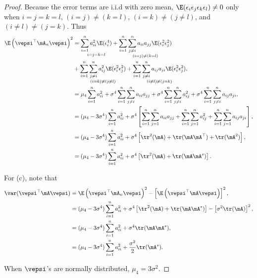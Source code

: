 \documentclass[english,12pt]{book}\usepackage[]{graphicx}\usepackage[]{xcolor}
\begin{document}
\begin{proof}
Because the error terms are i.i.d with zero mean, $\E(\epsilon_{i}\epsilon_j\epsilon_k\epsilon_l) \neq 0$ only when $i = j = k = l$, $(i = j)\neq(k = l)$, $(i = k)\neq (j\neq l)$, and $(i\neq l)\neq (j =k)$. Thus
\begin{equation*}
\begin{aligned}
\E\left(\vepsi^\top\mA_n\vepsi\right)^2 & = \underset{i = j = k = l}{\sum_{i = 1}^n a_{ii}^2\E(\epsilon_i^4)} + \underset{(i = j)\neq(k = l)}{\sum_{i = 1}^n\sum_{j\neq i}^na_{ii}a_{jj}\E(\epsilon_i^2\epsilon_j^2)} \\
& + \underset{(i = k)\neq (j\neq l)}{\sum_{i = 1}^n\sum_{j\neq i}^n a_{ij}^2\E(\epsilon_i^2\epsilon_j^2)} + \underset{(i\neq l)\neq (j =k)}{\sum_{i = 1}^n\sum_{j \neq i}^na_{ij}a_{ji}\E(\epsilon_i^2\epsilon_j^2)},\\
& = \mu_4\sum_{i = 1}^na_{ii}^2 + \sigma^4\sum_{i = 1}^n\sum_{j\neq i}^na_{ii}a_{jj} + \sigma^4\sum_{i = 1}^n\sum_{j\neq i}^n a_{ij}^2 + \sigma^4\sum_{i = 1}^n\sum_{j \neq i}^na_{ij}a_{ji}, \\
& = (\mu_4 - 3\sigma^4)\sum_{i=1}^na_{ii}^2 + \sigma^4\left[\sum_{i = 1}^n\sum_{j = 1}^n a_{ii}a_{jj} + \sum_{i = 1}^n\sum_{j=1}^na^2_{ij} + \sum_{i = 1}^n\sum_{j = 1}^na_{ij}a_{ji}\right], \\
& = (\mu_4 - 3\sigma^4)\sum_{i=1}^na_{ii}^2 + \sigma^4\left[\tr^2(\mA) + \tr(\mA\mA^\top) + \tr(\mA^2)\right], \\
& = (\mu_4 - 3\sigma^4)\sum_{i=1}^na_{ii}^2 + \sigma^4\left[\tr^2(\mA) + \tr(\mA\mA^s)\right].
\end{aligned}
\end{equation*}

For (c), note that
\begin{equation*}
\begin{aligned}
\var(\vepsi^\top\mA\vepsi) & = \E\left(\vepsi^\top\mA_n\vepsi\right)^2 - \left[\E\left(\vepsi^\top\mA\vepsi\right)\right]^2, \\
& = (\mu_4 - 3\sigma^4)\sum_{i=1}^na_{ii}^2 + \sigma^4\left[\tr^2(\mA) + \tr(\mA\mA^s)\right] - \left[\sigma^2\tr(\mA)\right]^2,\\
& = (\mu_4 - 3\sigma^4)\sum_{i=1}^na_{ii}^2 + \sigma^4\tr(\mA\mA^s), \\
& = (\mu_4 - 3\sigma^4)\sum_{i=1}^na_{ii}^2 + \frac{\sigma^2}{2}\tr(\mA^s).
\end{aligned}
\end{equation*}

When $\vepsi$'s are normally distributed, $\mu_4 = 3\sigma^2$. 
\end{proof}
\end{document}
